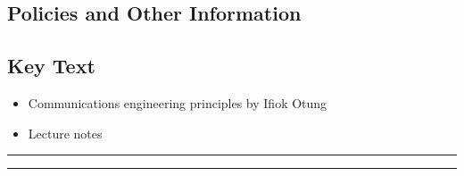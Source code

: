 

\subsection*{Policies and Other Information}
\subsection*{Key Text}
\begin{itemize}
    \item Communications engineering principles by Ifiok Otung
    \item Lecture notes
\end{itemize}
\vspace{2ex}\hrule
\vspace{2ex}\hrule\vspace{2ex}